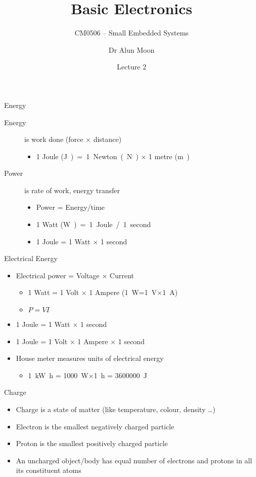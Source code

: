 \documentclass[svgnames,x11names]{beamer}
\title{Basic Electronics}
\subtitle{CM0506 -- Small Embedded Systems}
\date{Lecture 2}
\author{Dr Alun Moon}
\institute[CSDT]{Department of Computer Science and Digital Technology}
\begin{document}
\frame\maketitle

\begin{frame}{Energy}
  \begin{description}
  \item[Energy] is work done (force $\times$ distance)
    \begin{itemize}
    \item 1 Joule (\si\joule) = 1 Newton (\si\newton) $\times$ 1
      metre (\si\meter)
    \end{itemize}
  \item[Power] is rate of work, energy transfer
    \begin{itemize}
    \item Power = Energy/time
    \item 1 Watt (\si\watt) = 1 Joule / 1 second
    \item 1 Joule = 1 Watt $\times$ 1 second
    \end{itemize}
  \end{description}
\end{frame}

\begin{frame}{Electrical Energy}
  \begin{itemize}
  \item Electrical power = Voltage $\times$ Current
    \begin{itemize}
    \item 1 Watt = 1 Volt $\times$ 1 Ampere
      (\SI{1}{\watt}=\SI{1}{V}$\times$\SI{1}{A})
    \item $P = VI$
    \end{itemize}
  \item 1 Joule = 1 Watt $\times$ 1 second
  \item 1 Joule = 1 Volt $\times$ 1 Ampere $\times$ 1 second
  \item House meter measures units of electrical energy
    \begin{itemize}
    \item \SI{1}{\kilo\watt\hour} = \SI{1000}{W}$\times$\SI{1}{\hour}
      = \SI{3600000}{\joule}
    \end{itemize}

  \end{itemize}
\end{frame}

\begin{frame}{Charge}
\begin{itemize}
\item Charge is a state of matter (like temperature,
colour, density \ldots)
\item Electron is the smallest negatively charged particle
\item Proton is the smallest positively charged particle
\item An uncharged object/body has equal number of
electrons and protons in all its constituent atoms  
\end{itemize}
\end{frame}
\end{document}
